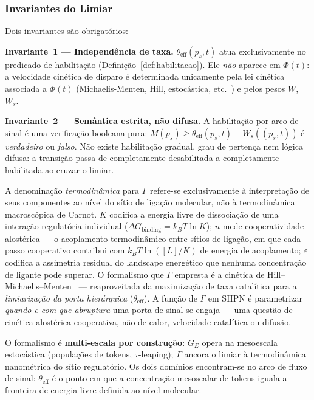 \subsubsection{Invariantes do Limiar}

Dois invariantes são obrigatórios:

\noindent\textbf{Invariante~1 --- Independência de taxa.}
$\theta_{\mathrm{eff}}(p_s,t)$ atua exclusivamente no predicado de habilitação
(Definição~\ref{def:habilitacao}).
Ele \emph{não} aparece em $\Phi(t)$: a velocidade cinética de disparo é
determinada unicamente pela lei cinética associada a $\Phi(t)$
(Michaelis-Menten, Hill, estocástica, etc.\ ) e pelos pesos $W$, $W_s$.

\noindent\textbf{Invariante~2 --- Semântica estrita, não difusa.}
A habilitação por arco de sinal é uma verificação booleana pura:
$M(p_s) \geq \theta_{\mathrm{eff}}(p_s,t) + W_s((p_s,t))$ é \emph{verdadeiro}
ou \emph{falso}.
Não existe habilitação gradual, grau de pertença nem lógica difusa:
a transição passa de completamente desabilitada a completamente habilitada
ao cruzar o limiar.

\begin{remark}
\label{rem:gamma-natureza}
A denominação \emph{termodinâmica} para $\Gamma$ refere-se exclusivamente
à interpretação de seus componentes ao nível do sítio de ligação molecular,
não à termodinâmica macroscópica de Carnot.
$K$ codifica a energia livre de dissociação de uma interação regulatória
individual ($\Delta G_\text{binding} = k_BT\ln K$);
$n$ mede cooperatividade alostérica --- o acoplamento termodinâmico entre
sítios de ligação, em que cada passo cooperativo contribui com
$k_BT\ln([L]/K)$ de energia de acoplamento;
$\varepsilon$ codifica a assimetria residual do landscape energético que
nenhuma concentração de ligante pode superar.
O formalismo que $\Gamma$ empresta é a cinética de
Hill--Michaelis--Menten~\cite{Hill1910,Michaelis1913} --- reaproveitada da
maximização de taxa catalítica para a \emph{limiarização da porta
hierárquica} ($\theta_\text{eff}$).
A função de $\Gamma$ em SHPN é parametrizar \emph{quando e com que abruptura}
uma porta de sinal se engaja --- uma questão de cinética alostérica
cooperativa, não de calor, velocidade catalítica ou difusão.

O formalismo é \textbf{multi-escala por construção}: $G_E$ opera na mesoescala
estocástica (populações de tokens, $\tau$-leaping); $\Gamma$ ancora o limiar à
termodinâmica nanométrica do sítio regulatório.  Os dois domínios encontram-se
no arco de fluxo de sinal: $\theta_\text{eff}$ é o ponto em que a concentração
mesoscalar de tokens iguala a fronteira de energia livre definida ao nível
molecular.
\end{remark}

